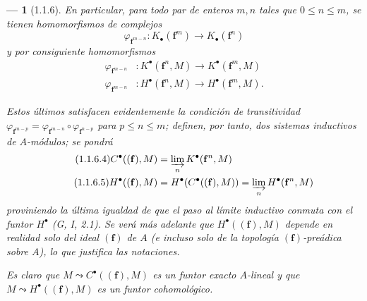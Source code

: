\documentclass[10pt,oneside,openany]{book}
\theoremstyle{egaenv}\newtheorem*{env}{---}
\theoremstyle{egastatement}
\theoremstyle{egadescription}
\newcommand{\oldpage}[2][]{\marginnote{\normalfont\scriptsize\textbf{#1}\,|\,#2}\ignorespaces}
\renewcommand{\leq}{\leqslant}
\begin{document}
\begin{env}[1.1.6]
\label{III.1.1.6-fr}
En particular, para todo par de enteros $m,n$ tales que $0\leq n\leq m$, se tienen homomorfismos de complejos
\begin{equation}
\label{III.1.1.6.1-fr}
\tag{1.1.6.1}
\varphi_{\mathbf f^{m-n}}:K_\bullet(\mathbf f^m)\longrightarrow
K_\bullet(\mathbf f^n)
\end{equation}
y por consiguiente homomorfismos
\begin{align}
\label{III.1.1.6.2-fr}
\tag{1.1.6.2}
\varphi_{\mathbf f^{m-n}} &:K^\bullet(\mathbf f^n,M)\longrightarrow
K^\bullet(\mathbf f^m,M)\\
\label{III.1.1.6.3-fr}
\tag{1.1.6.3}
\varphi_{\mathbf f^{m-n}} &:H^\bullet(\mathbf f^n,M)\longrightarrow
H^\bullet(\mathbf f^m,M).
\end{align}

\oldpage[III]{85}
Estos últimos satisfacen evidentemente la condición de transitividad
$\varphi_{\mathbf f^{m-p}}=
\varphi_{\mathbf f^{m-n}}\circ\varphi_{\mathbf f^{n-p}}$ para $p\leq n\leq m$; definen, por tanto, dos \emph{sistemas inductivos} de $A$-módulos; se pondrá
\begin{align}
\label{III.1.1.6.4-fr}
\tag{1.1.6.4}
C^\bullet((\mathbf f),M)&=\varinjlim_n K^\bullet(\mathbf f^n,M)\\
\label{III.1.1.6.5-fr}
\tag{1.1.6.5}
H^\bullet((\mathbf f),M)&=H^\bullet(C^\bullet((\mathbf f),M))
=\varinjlim_n H^\bullet(\mathbf f^n,M)
\end{align}
proviniendo la última igualdad de que el paso al límite inductivo conmuta con el funtor $H^\bullet$ (G, I, 2.1).
Se verá más adelante  que $H^\bullet((\mathbf f),M)$ depende en realidad solo del \emph{ideal $(\mathbf f)$} de $A$ (e incluso solo de la topología $(\mathbf f)$-preádica sobre $A$), lo que justifica las notaciones.

Es claro que $M\leadsto C^\bullet((\mathbf f),M)$ es un funtor exacto $A$-lineal y que $M\leadsto H^\bullet((\mathbf f),M)$ es un funtor cohomológico.
\end{env}
\end{document}
